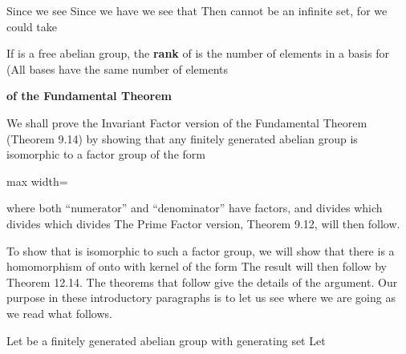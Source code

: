 \documentclass[11pt,oneside]{article}
\begin{document}
\begin{BookBody}
\noindent Since  we see  Since we have  we see that  Then  cannot be an infinite set, for we could take \BookEnd{\blacklozenge}

 If  is a free abelian group, the\textbf{ rank} of  is the number of elements in a basis for  (All bases have the same number of elements\BookEnd{\blacksquare}

 \textbf{ of the Fundamental Theorem}

\noindent We shall prove the Invariant Factor version of the Fundamental Theorem (Theorem 9.14) by showing that any finitely generated abelian group is isomorphic to a factor group of the form

\begin{center}\begin{adjustbox}{max width=\linewidth}\end{adjustbox}\end{center}

\noindent where both “numerator” and “denominator” have  factors, and  divides  which divides  which divides  The Prime Factor version, Theorem 9.12, will then follow.

To show that  is isomorphic to such a factor group, we will show that there is a homomorphism of  onto  with kernel of the form   The result will then follow by Theorem 12.14. The theorems that follow give the details of the argument. Our purpose in these introductory paragraphs is to let us see where we are going as we read what follows.

 Let  be a finitely generated abelian group with generating set  Let


\end{BookBody}
\end{document}
